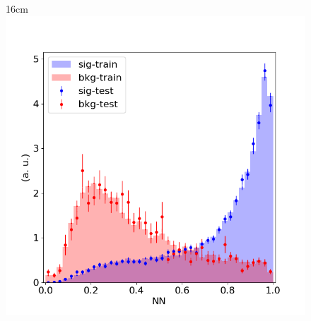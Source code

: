 \begin{figure}[hbtp]{16cm}
{		\includegraphics[scale=0.35]{ChapterAnalysis/figs/NNOvertrainingCheck_example}
		\label{}
	}\\		
\end{figure}

